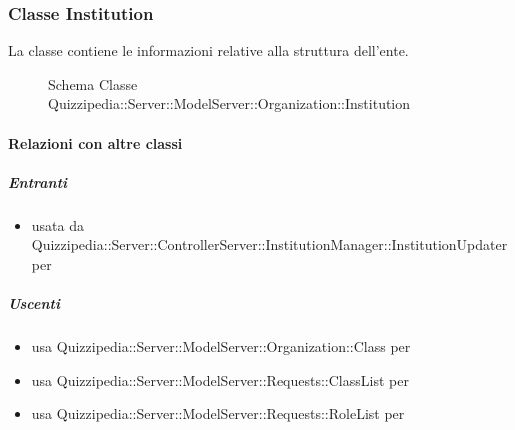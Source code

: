 \subsubsection{Classe Institution}
La classe contiene le informazioni relative alla struttura dell'ente.
\begin{figure}[H]
\centering
\noindent{}
\caption[Schema Classe Institution]{Schema Classe Quizzipedia::Server::ModelServer::Organization::Institution}
\end{figure}
\paragraph{Relazioni con altre classi}
\subparagraph{Entranti}
\begin{itemize}
\item usata da Quizzipedia::Server::ControllerServer::InstitutionManager::InstitutionUpdater per 
\end{itemize}
\subparagraph{Uscenti}
\begin{itemize}
\item usa Quizzipedia::Server::ModelServer::Organization::Class per 
\item usa Quizzipedia::Server::ModelServer::Requests::ClassList per 
\item usa Quizzipedia::Server::ModelServer::Requests::RoleList per 
\end{itemize}
